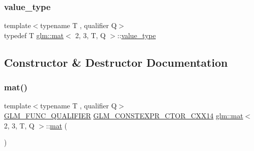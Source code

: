 \mbox{\label{structglm_1_1mat_3_012_00_013_00_01_t_00_01_q_01_4_a16f6111e5e9f3d29da5926277e63f668}} 
\subsubsection{\texorpdfstring{value\+\_\+type}{value\_type}}
{\footnotesize\ttfamily template$<$typename T , qualifier Q$>$ \\
typedef T \hyperlink{structglm_1_1mat}{glm\+::mat}$<$ 2, 3, T, Q $>$\+::\hyperlink{structglm_1_1mat_3_012_00_013_00_01_t_00_01_q_01_4_a16f6111e5e9f3d29da5926277e63f668}{value\+\_\+type}}



\subsection{Constructor \& Destructor Documentation}
\mbox{\label{structglm_1_1mat_3_012_00_013_00_01_t_00_01_q_01_4_a895bbb293e0af4e6f3fdc032e736e4eb}} 
\subsubsection{\texorpdfstring{mat()}{mat()}\hspace{0.1cm}{\footnotesize\ttfamily [1/21]}}
{\footnotesize\ttfamily template$<$typename T , qualifier Q$>$ \\
\hyperlink{setup_8hpp_a33fdea6f91c5f834105f7415e2a64407}{G\+L\+M\+\_\+\+F\+U\+N\+C\+\_\+\+Q\+U\+A\+L\+I\+F\+I\+ER} \hyperlink{setup_8hpp_a0900f9145e68bf6061b6f5e7be3fa751}{G\+L\+M\+\_\+\+C\+O\+N\+S\+T\+E\+X\+P\+R\+\_\+\+C\+T\+O\+R\+\_\+\+C\+X\+X14} \hyperlink{structglm_1_1mat}{glm\+::mat}$<$ 2, 3, T, Q $>$\+::\hyperlink{structglm_1_1mat}{mat} (\begin{DoxyParamCaption}{ }\end{DoxyParamCaption})}

\mbox{\label{structglm_1_1mat_3_012_00_013_00_01_t_00_01_q_01_4_a6b574b8414d3902192ded677b5476562}} 
